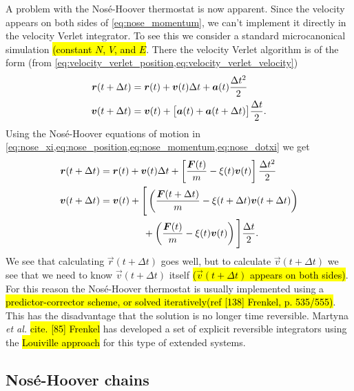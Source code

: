 A problem with the Nosé-Hoover thermostat is now apparent. Since the velocity appears on both sides of \cref{eq:nose_momentum}, we can't implement it directly in the velocity Verlet integrator. To see this we consider a standard microcanonical simulation \hl{(constant $N$, $V$, and $E$}. There the velocity Verlet algorithm is of the form
(from \cref{eq:velocity_verlet_position,eq:velocity_verlet_velocity})
\begin{align*}
    \boldsymbol{r}(t + \Delta t) &= \boldsymbol{r}(t) + \boldsymbol{v}(t)\Delta t + \boldsymbol{a}(t)\frac{\Delta t^2}{2}\\
    \boldsymbol{v}(t + \Delta t) &= \boldsymbol{v}(t) + \big[\boldsymbol{a}(t) + \boldsymbol{a}(t + \Delta t)\big] \frac{\Delta t}{2}.
\end{align*}
Using the Nosé-Hoover equations of motion in \cref{eq:nose_xi,eq:nose_position,eq:nose_momentum,eq:nose_dotxi} we get
\begin{align*}
    \rvec(t + \Delta t) &= \rvec(t) + \vvec(t)\Delta t + \left[ \frac{\vec F(t)}{m} - \xi(t)\vec v(t) \right] \frac{\Delta t^2}{2}\\
    \vvec(t + \Delta t) 
        &= \vvec(t) + \Bigg[ 
            \left(\frac{\vec F(t+\Delta t)}{m} - \xi(t+\Delta t)\vec v(t+\Delta t)\right) \\
            &\phantom{= \vvec(t) + \Big[} + \left(\frac{\vec F(t)}{m} - \xi(t)\vec v(t)\right)
        \Bigg] 
        \frac{\Delta t}{2}.
\end{align*}
We see that calculating $\vec r(t+\Delta t)$ goes well, but to calculate $\vec v(t+\Delta t)$ we see that we need to know $\vec v(t+\Delta t)$ itself \hl{($\vec v(t+\Delta t)$ appears on both sides)}. For this reason the Nosé-Hoover thermostat is usually implemented using a \hl{predictor-corrector scheme, or solved iteratively(ref [138] Frenkel, p. 535/555)}. This has the disadvantage that the solution is no longer time reversible. Martyna \emph{et al.} \hl{cite. [85] Frenkel} has developed a set of explicit reversible integrators using the \hl{Louiville approach} for this type of extended systems.

\subsection{Nos\'e-Hoover chains}







